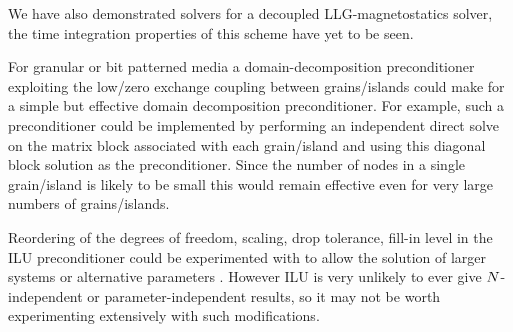 We have also demonstrated solvers for a decoupled LLG-magnetostatics solver, the time integration properties of this scheme have yet to be seen.


For granular or bit patterned media a domain-decomposition preconditioner exploiting the low/zero exchange coupling between grains/islands could make for a simple but effective domain decomposition preconditioner.
For example, such a preconditioner could be implemented by performing an independent direct solve on the matrix block associated with each grain/island and using this diagonal block solution as the preconditioner.
Since the number of nodes in a single grain/island is likely to be small this would remain effective even for very large numbers of grains/islands.

Reordering of the degrees of freedom, scaling, drop tolerance, fill-in level in the ILU preconditioner could be experimented with to allow the solution of larger systems or alternative parameters \cite[287]{Saad2000}.
However ILU is very unlikely to ever give $N$-independent or parameter-independent results, so  it may not be worth experimenting extensively with such modifications.




